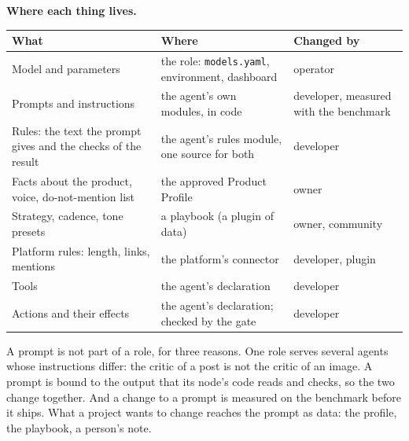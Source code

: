 \documentclass[11pt,a4paper]{article}
\begin{document}
\textbf{Where each thing lives.}
\begin{longtable}{@{}>{\raggedright\arraybackslash}p{5.4cm}>{\raggedright\arraybackslash}p{6.0cm}>{\raggedright\arraybackslash}p{3.9cm}@{}}
\toprule
\textbf{What} & \textbf{Where} & \textbf{Changed by}\\
\midrule
\endhead
Model and parameters & the role: \texttt{models.yaml}, environment, dashboard & operator\\
Prompts and instructions & the agent's own modules, in code & developer, measured with the benchmark\\
Rules: the text the prompt gives and the checks of the result & the agent's rules module, one source for both & developer\\
Facts about the product, voice, do-not-mention list & the approved Product Profile & owner\\
Strategy, cadence, tone presets & a playbook (a plugin of data) & owner, community\\
Platform rules: length, links, mentions & the platform's connector & developer, plugin\\
Tools & the agent's declaration & developer\\
Actions and their effects & the agent's declaration; checked by the gate & developer\\
\bottomrule
\end{longtable}
A prompt is not part of a role, for three reasons. One role serves several agents whose instructions differ: the critic of a post is not the critic of an image. A prompt is bound to the output that its node's code reads and checks, so the two change together. And a change to a prompt is measured on the benchmark before it ships. What a project wants to change reaches the prompt as data: the profile, the playbook, a person's note.
\end{document}
